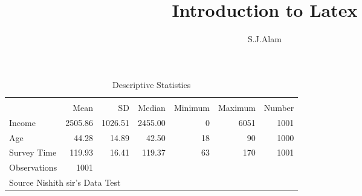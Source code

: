 \documentclass[10pt,a4paper,twoside]{article}
\author{S.J.Alam}
\title{Introduction to Latex}
\begin{document}
  \begin{table}[htbp]\centering
\def\sym#1{\ifmmode^{#1}\else\(^{#1}\)\fi}
\caption{Descriptive Statistics}
\begin{tabular}{l*{1}{rrrrrr}}
\toprule
                    &\multicolumn{6}{c}{}                                                         \\
                    &        Mean&          SD&      Median&     Minimum&     Maximum&      Number\\
\midrule
Income              &     2505.86&     1026.51&     2455.00&           0&        6051&        1001\\
Age                 &       44.28&       14.89&       42.50&          18&          90&        1000\\
Survey Time         &      119.93&       16.41&      119.37&          63&         170&        1001\\
\midrule
Observations        &        1001&            &            &            &            &            \\
\bottomrule
\multicolumn{7}{l}{\footnotesize Source Nishith sir's Data Test}\\
\end{tabular}
\end{table}
\end{document}
